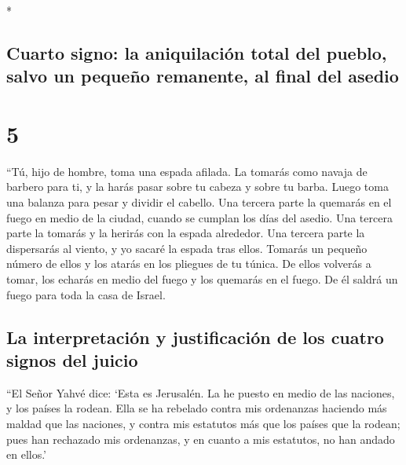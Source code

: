 \begin{paracol}{2}
\begin{otherlanguage}{english}
\end{otherlanguage}

\switchcolumn[0]*

\hypertarget{cuarto-signo-la-aniquilaciuxf3n-total-del-pueblo-salvo-un-pequeuxf1o-remanente-al-final-del-asedio}{%
\subsection{Cuarto signo: la aniquilación total del pueblo, salvo un
pequeño remanente, al final del
asedio}\label{cuarto-signo-la-aniquilaciuxf3n-total-del-pueblo-salvo-un-pequeuxf1o-remanente-al-final-del-asedio}}

\hypertarget{section-8}{%
\section{5}\label{section-8}}

 ``Tú, hijo de hombre, toma una espada afilada. La tomarás
como navaja de barbero para ti, y la harás pasar sobre tu cabeza y sobre
tu barba. Luego toma una balanza para pesar y dividir el cabello.
 Una tercera parte la quemarás en el fuego en medio de la
ciudad, cuando se cumplan los días del asedio. Una tercera parte la
tomarás y la herirás con la espada alrededor. Una tercera parte la
dispersarás al viento, y yo sacaré la espada tras ellos. 
Tomarás un pequeño número de ellos y los atarás en los pliegues de tu
túnica.  De ellos volverás a tomar, los echarás en medio
del fuego y los quemarás en el fuego. De él saldrá un fuego para toda la
casa de Israel.

\hypertarget{la-interpretaciuxf3n-y-justificaciuxf3n-de-los-cuatro-signos-del-juicio}{%
\subsection{La interpretación y justificación de los cuatro signos del
juicio}\label{la-interpretaciuxf3n-y-justificaciuxf3n-de-los-cuatro-signos-del-juicio}}

 ``El Señor Yahvé dice: `Esta es Jerusalén. La he puesto
en medio de las naciones, y los países la rodean.  Ella se
ha rebelado contra mis ordenanzas haciendo más maldad que las naciones,
y contra mis estatutos más que los países que la rodean; pues han
rechazado mis ordenanzas, y en cuanto a mis estatutos, no han andado en
ellos.'


\end{paracol}
